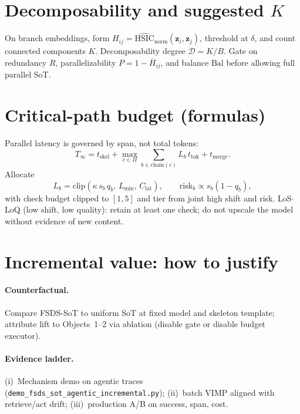 \documentclass[11pt]{article}
\newcommand{\z}{\mathbf{z}}
\newcommand{\VIMP}{\mathrm{VIMP}}
\begin{document}
\section{Decomposability and suggested $K$}
\label{sec:decomposability}

On branch embeddings, form $H_{ij}=\widehat{\mathrm{HSIC}}_{\mathrm{norm}}(\z_i,\z_j)$,
threshold at $\delta$, and count connected components $K$. Decomposability degree
$\mathcal{D}=K/B$. Gate on redundancy $R$, parallelizability $P=1-\overline{H}_{ij}$,
and balance $\mathrm{Bal}$ before allowing full parallel SoT.

\section{Critical-path budget (formulas)}
\label{sec:budget-formulas}

Parallel latency is governed by span, not total tokens:
\begin{equation}
  T_{\infty} = t_{\mathrm{skel}} + \max_{c\in\Pi}\sum_{b\in\mathrm{chain}(c)} L_b\, t_{\mathrm{tok}} + t_{\mathrm{merge}}.
\end{equation}
Allocate
\begin{equation}
  L_b = \mathrm{clip}(\kappa\, s_b\, q_b,\, L_{\min},\, C_{\mathrm{lat}}),
  \qquad
  \mathrm{risk}_b \propto s_b(1-q_b),
\end{equation}
with check budget clipped to $[1,5]$ and tier from joint high shift and risk.
LoS$\cdot$LoQ (low shift, low quality): retain at least one check; do not upscale
the model without evidence of new content.

\section{Incremental value: how to justify}
\label{sec:justify}

\paragraph{Counterfactual.} Compare FSDS-SoT to uniform SoT at fixed model and
skeleton template; attribute lift to Objects~1--2 via ablation (disable gate or
disable budget executor).

\paragraph{Evidence ladder.} (i)~Mechanism demo on agentic traces
(\texttt{demo\_fsds\_sot\_agentic\_incremental.py}); (ii)~batch $\VIMP$ aligned
with retrieve/act drift; (iii)~production A/B on success, span, cost.
\end{document}
